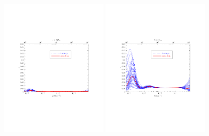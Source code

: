 \documentclass[11pt]{article}
\def \halffigwidth{0.48\textwidth}
\begin{document}
\begin{figure}
  \includegraphics[width=\halffigwidth,  trim = 1in 2.9in 1in 2.9in]{nobicep_spline0_p11_r0d02_eps_traj.pdf}%
  \includegraphics[width=\halffigwidth,  trim = 1in 2.9in 1in 2.9in]{nobicep_spline0_p11_r0d2_eps_traj.pdf} 

\end{figure}
\end{document}
